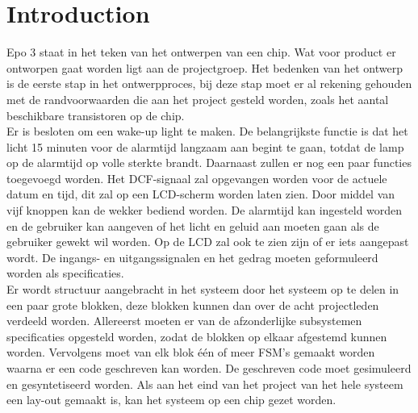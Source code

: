 \chapter{Introduction}
Epo 3 staat in het teken van het ontwerpen van een chip. Wat voor product er ontworpen gaat worden ligt aan de projectgroep. Het bedenken van het ontwerp is de eerste stap in het ontwerpproces, bij deze stap moet er al rekening gehouden met de randvoorwaarden die aan het project gesteld worden, zoals het aantal beschikbare transistoren op de chip.\\
Er is besloten om een wake-up light te maken. De belangrijkste functie is dat het licht 15 minuten voor de alarmtijd langzaam aan begint te gaan, totdat de lamp op de alarmtijd op volle sterkte brandt. Daarnaast zullen er nog een paar functies toegevoegd worden. Het DCF-signaal zal opgevangen worden voor de actuele datum en tijd, dit zal op een LCD-scherm worden laten zien. Door middel van vijf knoppen kan de wekker bediend worden. De alarmtijd kan ingesteld worden en de gebruiker kan aangeven of het licht en geluid aan moeten gaan als de gebruiker gewekt wil worden. Op de LCD zal ook te zien zijn of er iets aangepast wordt. De ingangs- en uitgangssignalen en het gedrag moeten geformuleerd worden als specificaties.\\
Er wordt structuur aangebracht in het systeem door het systeem op te delen in een paar grote blokken, deze blokken kunnen dan over de acht projectleden verdeeld worden. Allereerst moeten er van de afzonderlijke subsystemen specificaties opgesteld worden, zodat de blokken op elkaar afgestemd kunnen worden. Vervolgens moet van elk blok \'e\'en of meer FSM's gemaakt worden waarna er een code geschreven kan worden. De geschreven code moet gesimuleerd en gesyntetiseerd worden. Als aan het eind van het project van het hele systeem een lay-out gemaakt is, kan het systeem op een chip gezet worden.

